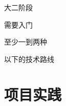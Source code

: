 \documentclass{beamer}
\begin{document}
\begin{frame}
    \vfill %
    \begin{center}
        \Huge
        大二阶段
        
        \vspace{0.5cm} %
        
        \huge
        需要入门
        
        \vspace{0.5cm} %
        
        \LARGE
        \alert{至少一到两种}
        
        \vspace{0.5cm} %
        
        \huge
        以下的技术路线
    \end{center}
    \vfill
\end{frame}

\section{项目实践}
\end{document}
